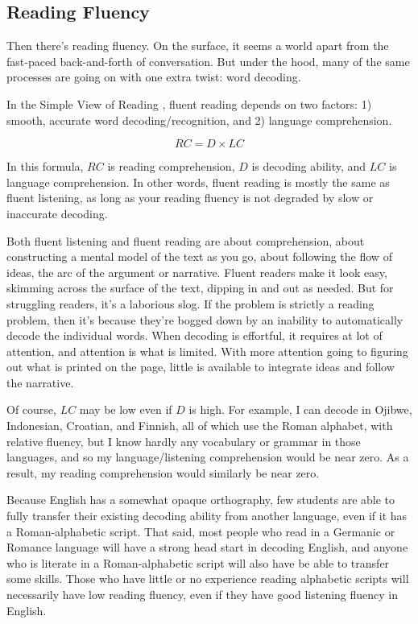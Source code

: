\subsection{Reading Fluency}\label{sec:reading-fluency}

Then there's reading fluency. On the surface, it seems a world apart from the fast-paced back-and-forth of conversation. But under the hood, many of the same processes are going on with one extra twist: word decoding.

In the Simple View of Reading \citep{Gough1986}, fluent reading depends on two factors: 1) smooth, accurate word decoding/recognition, and 2) language comprehension.

\begin{equation}
    RC = D\times LC
\end{equation}

In this formula, $RC$ is reading comprehension, $D$ is decoding ability, and $LC$ is language comprehension. In other words, fluent reading is mostly the same as fluent listening, as long as your reading fluency is not degraded by slow or inaccurate decoding.

Both fluent listening and fluent reading are about comprehension, about constructing a mental model of the text as you go, about following the flow of ideas, the arc of the argument or narrative. Fluent readers make it look easy, skimming across the surface of the text, dipping in and out as needed. But for struggling readers, it's a laborious slog. If the problem is strictly a reading problem, then it's because they're bogged down by an inability to automatically decode the individual words. When decoding is effortful, it requires at lot of attention, and attention is what is limited. With more attention going to figuring out what is printed on the page, little is available to integrate ideas and follow the narrative.

Of course, $LC$ may be low even if $D$ is high. For example, I can decode in Ojibwe, Indonesian, Croatian, and Finnish, all of which use the Roman alphabet, with relative fluency, but I know hardly any vocabulary or grammar in those languages, and so my language/listening comprehension would be near zero. As a result, my reading comprehension would similarly be near zero. 

Because English has a somewhat opaque orthography, few students are able to fully transfer their existing decoding ability from another language, even if it has a Roman-alphabetic script. That said, most people who read in a Germanic or Romance language will have a strong head start in decoding English, and anyone who is literate in a Roman-alphabetic script will also have be able to transfer some skills. Those who have little or no experience reading alphabetic scripts will necessarily have low reading fluency, even if they have good listening fluency in English.

